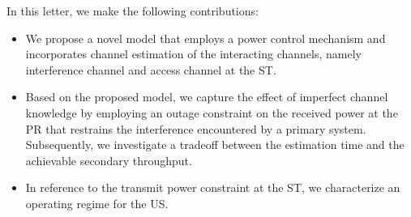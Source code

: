 \documentclass[letterpaper, twocolumn]{IEEEtran}
\begin{document}
In this letter, we make the following contributions: 
\begin{itemize}
\item 
We propose a novel model that employs a power control mechanism and incorporates channel estimation of the interacting channels, namely interference channel and access channel at the ST. %
\item 
Based on the proposed model, we capture the effect of imperfect channel knowledge by employing an outage constraint on the received power at the PR that restrains the interference encountered by a primary system. Subsequently, we investigate a tradeoff between the estimation time and the achievable secondary throughput. %
\item 
In reference to the transmit power constraint at the ST, we characterize an operating regime for the US. 

\end{itemize}

\end{document}
